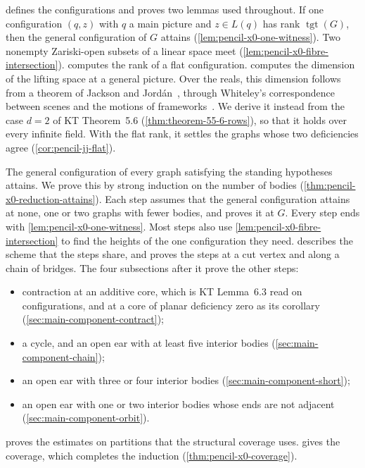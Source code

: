  defines the configurations and proves
two lemmas used throughout. If one configuration $(q, z)$ with $q$ a main
picture and $z \in L(q)$ has rank $\operatorname{tgt}(G)$, then the
general configuration of $G$ attains (\cref{lem:pencil-x0-one-witness}).
Two nonempty Zariski-open subsets of a linear space meet
(\cref{lem:pencil-x0-fibre-intersection}). 
computes the rank of a flat configuration. 
computes the dimension of the lifting space at a general picture. Over
the reals, this dimension follows from a theorem of Jackson and
Jord\'an~\cite[Theorem~7.1]{jacksonJordan2006pin}, through Whiteley's
correspondence between scenes and the motions of
frameworks~\cite{whiteley1984}. We derive it instead from the case
$d = 2$ of KT Theorem~5.6 (\cref{thm:theorem-55-6-rows}), so that it
holds over every infinite field. With the flat rank, it settles the
graphs whose two deficiencies agree (\cref{cor:pencil-jj-flat}).

The general configuration of every graph satisfying the standing
hypotheses attains. We prove this by strong induction on the number of
bodies (\cref{thm:pencil-x0-reduction-attains}). Each step assumes that
the general configuration attains at none, one or two graphs with fewer
bodies, and proves it at $G$. Every step ends with
\cref{lem:pencil-x0-one-witness}. Most steps also use
\cref{lem:pencil-x0-fibre-intersection} to find the heights of the one
configuration they need.  describes the
scheme that the steps share, and proves the steps at a cut vertex and
along a chain of bridges. The four subsections after it prove the other
steps:
\begin{itemize}
  \item contraction at an additive core, which is KT Lemma~6.3 read on
    configurations, and at a core of planar deficiency zero as its
    corollary (\cref{sec:main-component-contract});
  \item a cycle, and an open ear with at least five interior bodies
    (\cref{sec:main-component-chain});
  \item an open ear with three or four interior bodies
    (\cref{sec:main-component-short});
  \item an open ear with one or two interior bodies whose ends are not
    adjacent (\cref{sec:main-component-orbit}).
\end{itemize}
 proves the estimates on partitions that
the structural coverage uses.  gives the
coverage, which completes the induction (\cref{thm:pencil-x0-coverage}).

